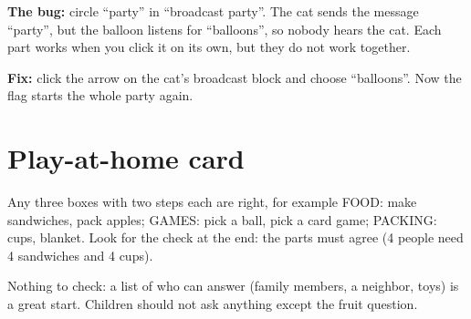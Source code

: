 \begin{answer}
\textbf{The bug:} circle \enquote{party} in \enquote{broadcast party}. The cat sends the message \enquote{party}, but the balloon listens for \enquote{balloons}, so nobody hears the cat. Each part works when you click it on its own, but they do not work together.

\textbf{Fix:} click the arrow on the cat's broadcast block and choose \enquote{balloons}. Now the flag starts the whole party again.
\end{answer}

\section{Play-at-home card}
\begin{answer}
Any three boxes with two steps each are right, for example FOOD: make sandwiches, pack apples; GAMES: pick a ball, pick a card game; PACKING: cups, blanket. Look for the check at the end: the parts must agree (4 people need 4 sandwiches and 4 cups).
\end{answer}

\begin{answer}
Nothing to check: a list of who can answer (family members, a neighbor, toys) is a great start. Children should not ask anything except the fruit question.
\end{answer}
